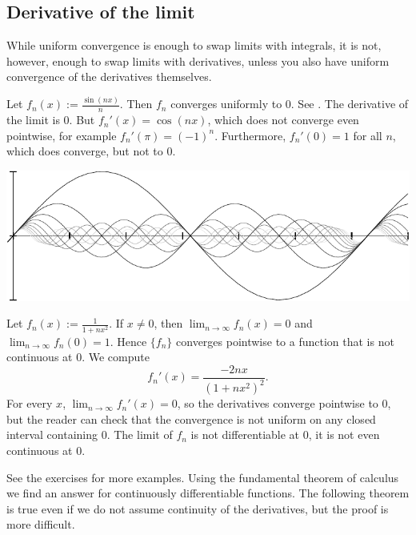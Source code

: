 \subsection{Derivative of the limit}

While uniform convergence is enough to swap limits with integrals, it is not,
however, enough to swap limits with derivatives, unless you also have
uniform convergence of the derivatives themselves.

\begin{example}
Let $f_n(x) := \frac{\sin(nx)}{n}$.  Then $f_n$ converges uniformly to
0.  See .
The derivative of the limit is 0.  But $f_n'(x) = \cos(nx)$, which
does not converge even pointwise, for
example $f_n'(\pi) = {(-1)}^n$.  Furthermore,
$f_n'(0) = 1$ for all $n$, which does converge, but not to 0.
\begin{myfigureht}
\includegraphics{figures/conv1nsinxn}
\caption{Graphs of $\frac{\sin(nx)}{n}$ for
$n=1,2,\ldots,10$, with higher $n$ in lighter gray.%
\label{fig:conv1nsinxn}}
\end{myfigureht}
\end{example}

\begin{example} \label{exercise:badconvergenceder}
Let $f_n(x) := \frac{1}{1+nx^2}$.
If $x \not= 0$, then $\lim_{n \to \infty} f_n(x) = 0$
and $\lim_{n \to \infty} f_n(0) = 1$.
Hence $\{ f_n \}$ converges pointwise to a function that is not continuous
at $0$.
We compute
\begin{equation*}
f_n'(x) %
= \frac{-2 n x}{(1+ n x^2)^2} .
\end{equation*}
For every $x$, $\lim_{n\to\infty} f_n'(x) = 0$, so the derivatives
converge pointwise to 0,
but the reader can check that the convergence is not uniform on any closed
interval containing 0.
The limit of $f_n$ is not differentiable at 0, it is not even
continuous at 0.
\end{example}

See the exercises for more examples.  Using 
the fundamental theorem of calculus we find an answer for continuously
differentiable functions.  The following theorem is true even if 
we do not assume continuity of the derivatives, but the proof is more
difficult.

